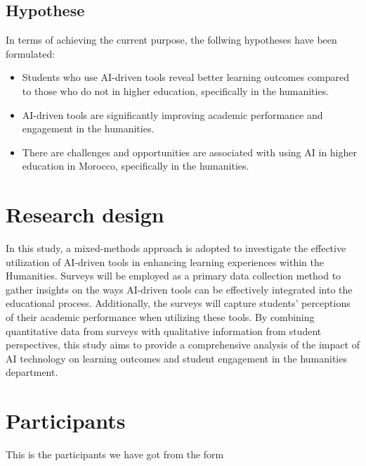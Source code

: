 \subsection{Hypothese}
In terms of achieving the current purpose, the follwing hypotheses have been formulated:
\begin{itemize}
	\item Students who use AI-driven tools reveal better learning outcomes
	      compared to those who do not in higher education, specifically in the humanities.
	\item AI-driven tools are significantly improving academic
	      performance and engagement in the humanities.
	\item There are challenges and opportunities are associated with using AI in higher
	      education in Morocco, specifically in the humanities.
\end{itemize}

\section{Research design}
In this study, a mixed-methods approach is adopted to investigate the effective utilization
of AI-driven tools in enhancing learning experiences within the Humanities. Surveys will
be employed as a primary data collection method to gather insights on the ways AI-driven
tools can be effectively integrated into the educational process. Additionally, the surveys
will capture students' perceptions of their academic performance when utilizing these tools.
By combining quantitative data from surveys with qualitative information from student perspectives,
this study aims to provide a comprehensive analysis of the impact of AI technology on learning outcomes
and student engagement in the humanities department.

\section{Participants}
This is the participants we have got from the form

